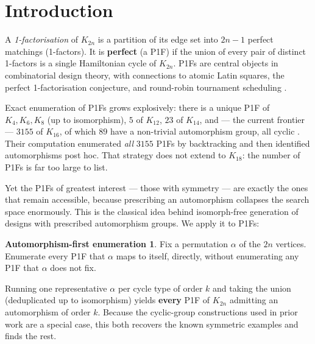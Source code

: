 \documentclass[11pt,reqno]{amsart}
\theoremstyle{plain}
\theoremstyle{definition}
\newtheorem*{principle}{Automorphism-first enumeration}
\numberwithin{theorem}{section}
\begin{document}
\maketitle

\section{Introduction}

A \emph{1-factorisation} of $K_{2n}$ is a partition of its edge set into $2n-1$ perfect
matchings (1-factors). It is \textbf{perfect} (a P1F) if the union of every pair of
distinct 1-factors is a single Hamiltonian cycle of $K_{2n}$. P1Fs are central
objects in combinatorial design theory, with connections to atomic Latin squares,
the perfect 1-factorisation conjecture, and round-robin tournament scheduling
\cite{Wallis,MendelsohnRosa}.

Exact enumeration of P1Fs grows explosively: there is a unique P1F of $K_4,K_6,K_8$
(up to isomorphism), $5$ of $K_{12}$, $23$ of $K_{14}$, and --- the current frontier ---
$3155$ of $K_{16}$, of which $89$ have a non-trivial automorphism group, all cyclic
\cite{GillWanless}. Their computation enumerated \emph{all} $3155$ P1Fs by backtracking and
then identified automorphisms post hoc. That strategy does not extend to $K_{18}$:
the number of P1Fs is far too large to list.

Yet the P1Fs of greatest interest --- those with symmetry --- are exactly the ones that
remain accessible, because prescribing an automorphism collapses the search space
enormously. This is the classical idea behind isomorph-free generation of designs
with prescribed automorphism groups. We apply it to P1Fs:

\begin{principle}
Fix a permutation $\alpha$ of the $2n$ vertices.
Enumerate every P1F that $\alpha$ maps to itself, directly, without enumerating any
P1F that $\alpha$ does not fix.
\end{principle}

Running one representative $\alpha$ per cycle type of order $k$ and taking the union
(deduplicated up to isomorphism) yields \textbf{every} P1F of $K_{2n}$ admitting an
automorphism of order $k$. Because the cyclic-group constructions used in prior work
are a special case, this both recovers the known symmetric examples and finds the
rest.
\end{document}
